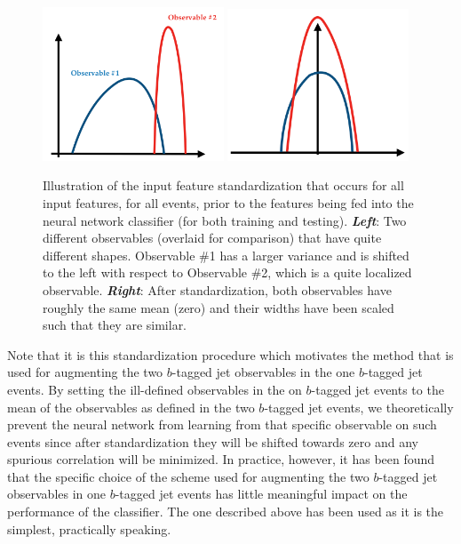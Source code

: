 \begin{figure}[!htb]
    \begin{center}
        \includegraphics[width=0.48\textwidth]{figures/search_hh/mva/feature_standard_1}
        \includegraphics[width=0.48\textwidth]{figures/search_hh/mva/feature_standard_2}
        \caption{
            Illustration of the input feature standardization that occurs for all input features,
            for all events, prior to the features being fed into the neural network classifier
            (for both training and testing).
            \textit{\textbf{Left}}: Two different observables (overlaid for comparison) that have quite
            different shapes. Observable \#1 has a larger variance and is shifted to the left with
            respect to Observable \#2, which is a quite localized observable.
            \textit{\textbf{Right}}: After standardization, both observables have roughly the same
            mean (zero) and their widths have been scaled such that they are similar.
        }
        \label{fig:nn_feature_standard}
    \end{center}
\end{figure}

Note that it is this standardization procedure which motivates the method that
is used for augmenting the two $b$-tagged jet observables in the one $b$-tagged jet events.
By setting the ill-defined observables in the on $b$-tagged jet events to the mean of the observables
as defined in the two $b$-tagged jet events, we theoretically prevent the neural network from learning
from that specific observable on such events since after standardization they will be shifted towards zero
and any spurious correlation will be minimized.
In practice, however, it has been found that the specific choice of the scheme used for augmenting the two $b$-tagged jet observables
in one $b$-tagged jet events has little meaningful impact on the performance of the classifier.
The one described above has been used as it is the simplest, practically speaking.

